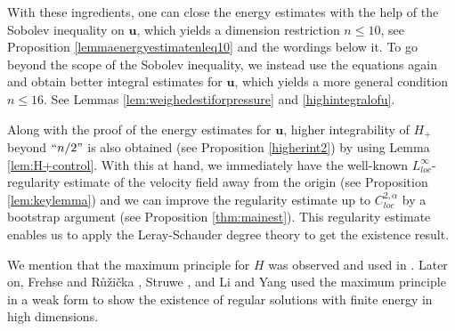 \documentclass[12pt]{amsart}
\newcommand{\Bu}{{\boldsymbol{u}}}
\newcommand{\Bf}{{\boldsymbol{f}}}
\begin{document}
	{ With these ingredients, one can close the energy estimates with the help of the Sobolev inequality on $\Bu$, which yields a dimension restriction $n\leq 10$, see Proposition \ref{lemmaenergyestimatenleq10} and the wordings below it. To go beyond the scope of the Sobolev inequality, we instead use the equations again and obtain better integral estimates for $\Bu$, which yields a more general condition $n\leq 16$. See Lemmas \ref{lem:weighedestiforpressure} and \ref{highintegralofu}.
	}
	
	
	
	Along with the proof of the energy estimates for $\Bu$, higher integrability of $H_+$ beyond $``n/2"$ is also obtained (see Proposition \ref{higherint2}) by using Lemma \ref{lem:H+control}. 
	With this at hand, we immediately have the well-known $L^\infty_{loc}$-regularity estimate of the velocity field away from the origin (see Proposition \ref{lem:keylemma}) and we can improve the regularity estimate up to $C^{2,\alpha}_{loc}$ by a bootstrap argument (see Proposition \ref{thm:mainest}). 
	This regularity estimate enables us to apply the Leray-Schauder degree theory to get the existence result.
	
	We mention that the maximum principle for $H$ was observed and used in \cite{Serrin, GilbargWeinberger78, Amick}. Later on,  Frehse and R{\r u}\v{z}i\v{c}ka \cite{FrehseRuzicka96}, Struwe \cite{Struwe95}, and Li and Yang \cite{LiYang22} used the maximum principle    in a weak form to show the existence of regular solutions with finite energy in high dimensions. 
	
\end{document}

